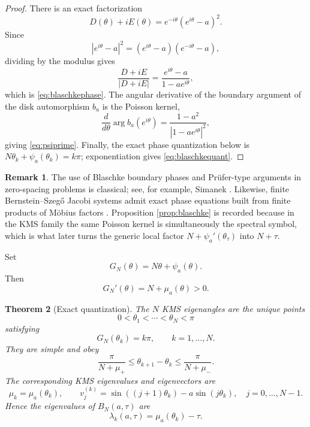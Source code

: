 \documentclass[11pt,reqno]{amsart}
\theoremstyle{plain}
\newtheorem{theorem}{Theorem}
\theoremstyle{definition}
\newtheorem{remark}[theorem]{Remark}
\begin{document}
\begin{proof}
There is an exact factorization
\[
D(\theta)+iE(\theta)
=e^{-i\theta}(e^{i\theta}-a)^2.
\]
Since
\[
|e^{i\theta}-a|^2
=(e^{i\theta}-a)(e^{-i\theta}-a),
\]
dividing by the modulus gives
\[
\frac{D+iE}{|D+iE|}
=\frac{e^{i\theta}-a}{1-ae^{i\theta}},
\]
which is \eqref{eq:blaschkephase}.  The angular derivative of the boundary
argument of the disk automorphism $b_a$ is the Poisson kernel,
\[
\frac{d}{d\theta}\arg b_a(e^{i\theta})
=\frac{1-a^2}{|1-ae^{i\theta}|^2},
\]
giving \eqref{eq:psiprime}.  Finally, the exact phase quantization below is
$N\theta_k+\psi_a(\theta_k)=k\pi$; exponentiation gives
\eqref{eq:blaschkequant}.
\end{proof}

\begin{remark}
The use of Blaschke boundary phases and Pr\"ufer-type arguments in zero-spacing
problems is classical; see, for example, Simanek \cite{Simanek2020}.  Likewise,
finite Bernstein--Szeg\H{o} Jacobi systems admit exact phase equations built from
finite products of Möbius factors \cite{vanDiejenEmsiz2018}.  Proposition
\ref{prop:blaschke} is recorded because in the KMS family the same Poisson kernel
is simultaneously the spectral symbol, which is what later turns the generic local
factor $N+\psi_a'(\theta_\tau)$ into $N+\tau$.
\end{remark}

Set
\begin{equation}\label{eq:G}
G_N(\theta)=N\theta+\psi_a(\theta).
\end{equation}
Then
\begin{equation}\label{eq:Gprime}
G_N'(\theta)=N+\mu_a(\theta)>0.
\end{equation}

\begin{theorem}[Exact quantization]\label{thm:quant}
The $N$ KMS eigenangles are the unique points
\[
0<\theta_1<\cdots<\theta_N<\pi
\]
satisfying
\begin{equation}\label{eq:quant}
G_N(\theta_k)=k\pi,
\qquad k=1,\ldots,N.
\end{equation}
They are simple and obey
\begin{equation}\label{eq:spacing}
\frac{\pi}{N+\mu_+}
\le \theta_{k+1}-\theta_k
\le \frac{\pi}{N+\mu_-}.
\end{equation}
The corresponding KMS eigenvalues and eigenvectors are
\begin{equation}\label{eq:eigs}
\mu_k=\mu_a(\theta_k),
\qquad
v_j^{(k)}=\sin((j+1)\theta_k)-a\sin(j\theta_k),
\quad j=0,\ldots,N-1.
\end{equation}
Hence the eigenvalues of $B_N(a,\tau)$ are
\begin{equation}\label{eq:shiftedeigs}
\lambda_k(a,\tau)=\mu_a(\theta_k)-\tau.
\end{equation}
\end{theorem}
\end{document}
